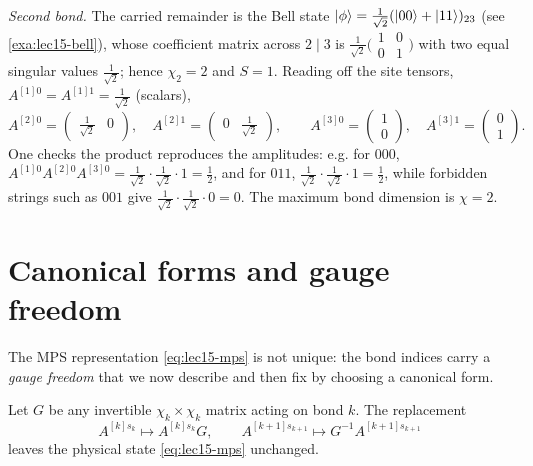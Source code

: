 \begin{example}
\emph{Second bond.} The carried remainder is the Bell state
$\ket{\phi}=\tfrac1{\sqrt2}(\ket{00}+\ket{11})_{23}$ (see
\cref{exa:lec15-bell}), whose coefficient matrix across $2\mid3$ is
$\tfrac1{\sqrt2}\bigl(\begin{smallmatrix}1&0\\0&1\end{smallmatrix}\bigr)$ with two
equal singular values $\tfrac1{\sqrt2}$; hence $\chi_2=2$ and $S=1$. Reading off
the site tensors, $A^{[1]0}=A^{[1]1}=\tfrac1{\sqrt2}$ (scalars),
\[
  A^{[2]0}=\begin{pmatrix}\tfrac1{\sqrt2}&0\end{pmatrix},\quad
  A^{[2]1}=\begin{pmatrix}0&\tfrac1{\sqrt2}\end{pmatrix},\qquad
  A^{[3]0}=\begin{pmatrix}1\\0\end{pmatrix},\quad
  A^{[3]1}=\begin{pmatrix}0\\1\end{pmatrix}.
\]
One checks the product reproduces the amplitudes: e.g. for $000$,
$A^{[1]0}A^{[2]0}A^{[3]0}=\tfrac1{\sqrt2}\cdot\tfrac1{\sqrt2}\cdot1=\tfrac12$, and
for $011$, $\tfrac1{\sqrt2}\cdot\tfrac1{\sqrt2}\cdot1=\tfrac12$, while forbidden
strings such as $001$ give $\tfrac1{\sqrt2}\cdot\tfrac1{\sqrt2}\cdot0=0$. The
maximum bond dimension is $\chi=2$.
\end{example}

\section{Canonical forms and gauge freedom}
\label{sec:lec15-4}

The MPS representation \eqref{eq:lec15-mps} is not unique: the bond indices carry
a \emph{gauge freedom} that we now describe and then fix by choosing a canonical
form.

\begin{proposition}\label{prop:lec15-gauge}
Let $G$ be any invertible $\chi_k\times\chi_k$ matrix acting on bond $k$. The
replacement
\begin{equation}\label{eq:lec15-gauge}
  A^{[k]s_k}\longmapsto A^{[k]s_k}G,\qquad
  A^{[k+1]s_{k+1}}\longmapsto G^{-1}A^{[k+1]s_{k+1}}
\end{equation}
leaves the physical state \eqref{eq:lec15-mps} unchanged.
\end{proposition}

